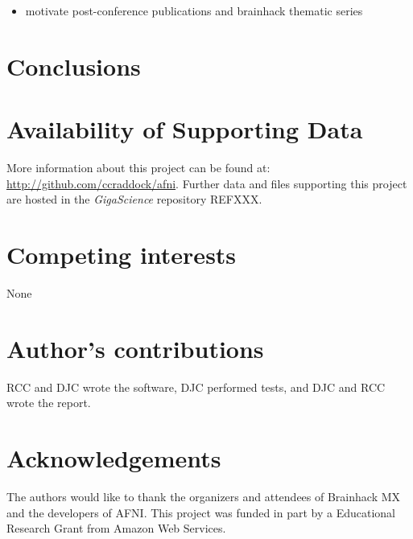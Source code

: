 \documentclass[11pt]{bmc_article_s50}
\providecommand{\tightlist}{%
  \setlength{\itemsep}{0pt}\setlength{\parskip}{0pt}}
\begin{document}
\begin{itemize}
\tightlist
\item
  motivate post-conference publications and brainhack thematic series
\end{itemize}

\section{Conclusions}\label{conclusions}


\section*{Availability of Supporting Data}
More information about this project can be found at: \url{http://github.com/ccraddock/afni}. Further data and files supporting this project are hosted in the \emph{GigaScience} repository REFXXX.

\section*{Competing interests}
None

\section*{Author's contributions}
RCC and DJC wrote the software, DJC performed tests, and DJC and RCC
wrote the report.

\section*{Acknowledgements}
The authors would like to thank the organizers and attendees of
Brainhack MX and the developers of AFNI. This project was funded in part
by a Educational Research Grant from Amazon Web Services.

  
  

\end{document}
